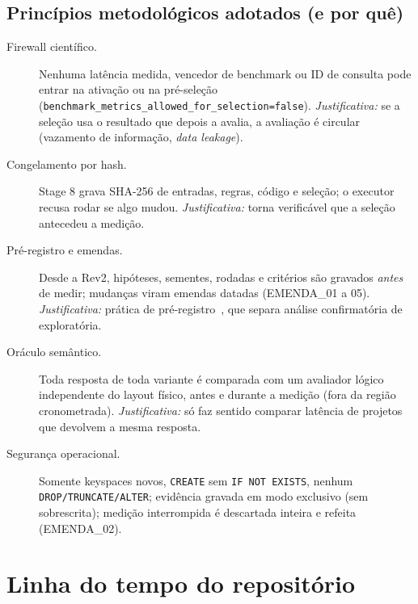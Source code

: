 \documentclass[11pt,a4paper]{article}
\begin{document}
\subsection{Princípios metodológicos adotados (e por quê)}
\begin{description}
\item[Firewall científico.] Nenhuma latência medida, vencedor de benchmark ou ID de consulta pode entrar na ativação ou na pré-seleção (\texttt{benchmark\_metrics\_allowed\_for\_selection=false}). \emph{Justificativa:} se a seleção usa o resultado que depois a avalia, a avaliação é circular (vazamento de informação, \emph{data leakage}).
\item[Congelamento por hash.] Stage 8 grava SHA-256 de entradas, regras, código e seleção; o executor recusa rodar se algo mudou. \emph{Justificativa:} torna verificável que a seleção antecedeu a medição.
\item[Pré-registro e emendas.] Desde a Rev2, hipóteses, sementes, rodadas e critérios são gravados \emph{antes} de medir; mudanças viram emendas datadas (EMENDA\_01 a 05). \emph{Justificativa:} prática de pré-registro~\cite{nosek2018}, que separa análise confirmatória de exploratória.
\item[Oráculo semântico.] Toda resposta de toda variante é comparada com um avaliador lógico independente do layout físico, antes e durante a medição (fora da região cronometrada). \emph{Justificativa:} só faz sentido comparar latência de projetos que devolvem a mesma resposta.
\item[Segurança operacional.] Somente keyspaces novos, \texttt{CREATE} sem \texttt{IF NOT EXISTS}, nenhum \texttt{DROP/TRUNCATE/ALTER}; evidência gravada em modo exclusivo (sem sobrescrita); medição interrompida é descartada inteira e refeita (EMENDA\_02).
\end{description}

\section{Linha do tempo do repositório}
\end{document}
